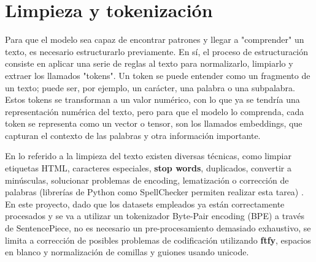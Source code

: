 \documentclass[11pt]{book}
\theoremstyle{plain}
\theoremstyle{definition}
\begin{document}
\section{Limpieza y tokenización}
Para que el modelo sea capaz de encontrar patrones y llegar a "comprender" un texto, es necesario estructurarlo previamente. En sí, el proceso de estructuración consiste en aplicar una serie de reglas al texto para normalizarlo, limpiarlo y extraer los llamados "tokens". Un token se puede entender como un fragmento de un texto; puede ser, por ejemplo, un carácter, una palabra o una subpalabra. Estos tokens se transforman a un valor numérico, con lo que ya se tendría una representación numérica del texto, pero para que el modelo lo comprenda, cada token se representa como un vector o tensor, son los llamados embeddings, que capturan el contexto de las palabras y otra información importante. \parencite{lmpo2020bpe}


En lo referido a la limpieza del texto existen diversas técnicas, como limpiar etiquetas HTML, caracteres especiales, \textbf{stop words}, duplicados, convertir a minúsculas, solucionar problemas de encoding, lematización o corrección de palabras (librerías de Python como SpellChecker permiten realizar esta tarea) \parencite{shabbir2021cleaning}. En este proyecto, dado que los datasets empleados ya están correctamente procesados y se va a utilizar un tokenizador Byte-Pair encoding (BPE) a través de SentencePiece, no es necesario un pre-procesamiento demasiado exhaustivo, se limita a corrección de posibles problemas de codificación utilizando \textbf{ftfy}, espacios en blanco y normalización de comillas y guiones usando unicode.
\end{document}

